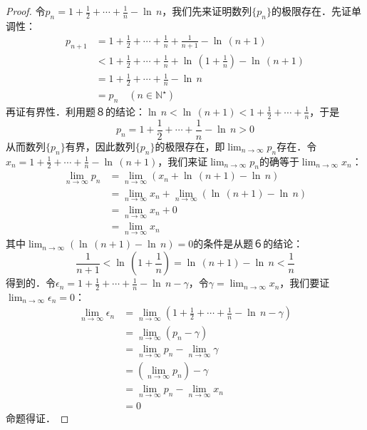 \begin{proof}
令$\displaystyle p_n = 1 + \frac{1}{2} + \cdots + \frac{1}{n} - \ln \, n$，我们先来证明数列$\{ p_n \}$的极限存在．先证单调性：
\begin{align}
    p_{n+1} &= 1 + \frac{1}{2} + \cdots + \frac{1}{n} + \frac{1}{n+1} - \ln \, \left( n + 1 \right) \\
    &< 1 + \frac{1}{2} + \cdots + \frac{1}{n} + \ln \, \left( 1 + \frac{1}{n} \right) - \ln \, \left(n+1\right) \\
    &= 1 + \frac{1}{2} + \cdots + \frac{1}{n} - \ln \, n \\
    &= p_n \quad (n \in \mathbb{N}^\star)
\end{align}
再证有界性．利用题８的结论：$\displaystyle \ln \, n < \ln \, \left( n+1 \right) < 1 + \frac{1}{2} + \cdots +\frac{1}{n}$，于是
\begin{equation}
    p_n = 1 + \frac{1}{2} +\cdots + \frac{1}{n} - \ln \, n > 0
\end{equation}
从而数列$\{ p_n \}$有界，因此数列$\{ p_n \}$的极限存在，即$ \displaystyle \lim_{n \to \infty} p_n$存在．令$\displaystyle x_n = 1 + \frac{1}{2} + \cdots + \frac{1}{n} - \ln \, \left( n + 1\right)$，我们来证$\displaystyle \lim_{n \to \infty} p_n$的确等于$\displaystyle \lim_{n \to \infty} x_n$：
\begin{align}
    \lim_{n \to \infty} p_n &= \lim_{n \to \infty} \left( x_n + \ln \, \left( n+1 \right) - \ln \, n \right) \\
    &= \lim_{n \to \infty} x_n + \lim_{n \to \infty} \left( \ln \, \left(n+1\right) - \ln \, n \right) \\
    &= \lim_{n \to \infty} x_n + 0 \\
    &= \lim_{n \to \infty} x_n
\end{align}
其中$\displaystyle \lim_{n \to \infty} \left( \ln \, \left(n+1\right) - \ln \, n\right) = 0$的条件是从题６的结论：
\begin{equation}
\frac{1}{n+1} < \ln \, \left(1 + \frac{1}{n}\right) = \ln \, \left(n+1\right) - \ln \, n < \frac{1}{n}
\end{equation}
得到的．令$\displaystyle \epsilon_n = 1 + \frac{1}{2} +\cdots + \frac{1}{n} - \ln \, n - \gamma$，令$\displaystyle \gamma = \lim_{n \to \infty} x_n$，我们要证$\displaystyle \lim_{n \to \infty} \epsilon_n = 0$：
\begin{align}
    \lim_{n \to \infty} \epsilon_n &= \lim_{n \to \infty} \left(1 + \frac{1}{2} + \cdots + \frac{1}{n} - \ln \, n - \gamma \right) \\
    &= \lim_{n \to \infty} \left( p_n - \gamma \right) \\
    &= \lim_{n\to \infty} p_n - \lim_{n\to \infty} \gamma \\
    &= \left( \lim_{n\to \infty} p_n \right) - \gamma \\
    &= \lim_{n\to \infty} p_n - \lim_{n \to \infty} x_n \\ 
    &= 0
\end{align}
命题得证．
\end{proof}
